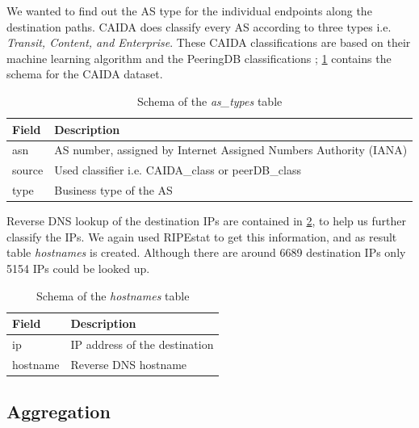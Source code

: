 \FloatBarrier

We wanted to find out the AS type for the individual endpoints along the destination paths. CAIDA \cite{caida} does classify every AS according to three types i.e. \textit{Transit, Content, and Enterprise}. These CAIDA  classifications are based on their machine learning algorithm and the PeeringDB classifications \cite{peeringdb}; \cref{table:caida} contains the schema for the CAIDA dataset.    

\begin{table}[!h]
	\centering
	\caption{Schema of the \textit{as\_types} table}
	\label{table:caida}
	\begin{tabular}{lp{7cm}}
  		\toprule
  		\textbf{Field} & \textbf{Description} \\ 
  		\midrule
  		asn & AS number, assigned by Internet Assigned Numbers Authority (IANA)\\
  		source & Used classifier i.e. CAIDA\_class or peerDB\_class \\
  		type & Business type of the AS \\
  		\bottomrule
\end{tabular}
\end{table}

\FloatBarrier

Reverse DNS lookup of the destination IPs are contained in \cref{table:hostnames}, to help us further classify the IPs. We again used RIPEstat \cite{ripestat} to  get this information, and as result table \textit{hostnames} is created. 
Although there are around 6689 destination IPs only 5154 IPs could be looked up. 

\begin{table}[!h]
	\centering
	\caption{Schema of the \textit{hostnames} table}
	\label{table:hostnames}
	\begin{tabular}{lp{7cm}}
  		\toprule
  		\textbf{Field} & \textbf{Description} \\ 
  		\midrule
  		ip & IP address of the destination \\
  		hostname & Reverse DNS hostname \\
  		\bottomrule
\end{tabular}
\end{table}

\FloatBarrier

\subsection*{Aggregation}

